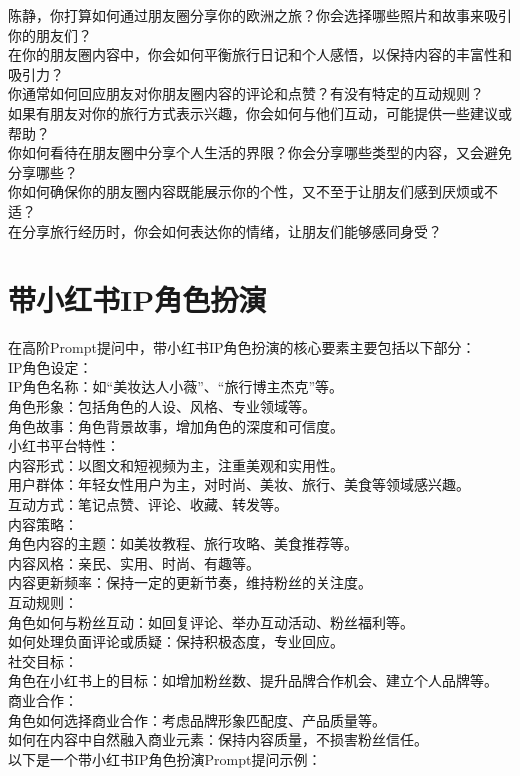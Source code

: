 \documentclass[12pt]{book}
\begin{document}
陈静，你打算如何通过朋友圈分享你的欧洲之旅？你会选择哪些照片和故事来吸引你的朋友们？\\
在你的朋友圈内容中，你会如何平衡旅行日记和个人感悟，以保持内容的丰富性和吸引力？\\
你通常如何回应朋友对你朋友圈内容的评论和点赞？有没有特定的互动规则？\\
如果有朋友对你的旅行方式表示兴趣，你会如何与他们互动，可能提供一些建议或帮助？\\
你如何看待在朋友圈中分享个人生活的界限？你会分享哪些类型的内容，又会避免分享哪些？\\
你如何确保你的朋友圈内容既能展示你的个性，又不至于让朋友们感到厌烦或不适？\\
在分享旅行经历时，你会如何表达你的情绪，让朋友们能够感同身受？\\

\section{带小红书IP角色扮演}
在高阶Prompt提问中，带小红书IP角色扮演的核心要素主要包括以下部分：\\

IP角色设定：\\
IP角色名称：如“美妆达人小薇”、“旅行博主杰克”等。\\
角色形象：包括角色的人设、风格、专业领域等。\\
角色故事：角色背景故事，增加角色的深度和可信度。\\
小红书平台特性：\\
内容形式：以图文和短视频为主，注重美观和实用性。\\
用户群体：年轻女性用户为主，对时尚、美妆、旅行、美食等领域感兴趣。\\
互动方式：笔记点赞、评论、收藏、转发等。\\
内容策略：\\
角色内容的主题：如美妆教程、旅行攻略、美食推荐等。\\
内容风格：亲民、实用、时尚、有趣等。\\
内容更新频率：保持一定的更新节奏，维持粉丝的关注度。\\
互动规则：\\
角色如何与粉丝互动：如回复评论、举办互动活动、粉丝福利等。\\
如何处理负面评论或质疑：保持积极态度，专业回应。\\
社交目标：\\
角色在小红书上的目标：如增加粉丝数、提升品牌合作机会、建立个人品牌等。\\
商业合作：\\
角色如何选择商业合作：考虑品牌形象匹配度、产品质量等。\\
如何在内容中自然融入商业元素：保持内容质量，不损害粉丝信任。\\
以下是一个带小红书IP角色扮演Prompt提问示例：\\
\end{document}
